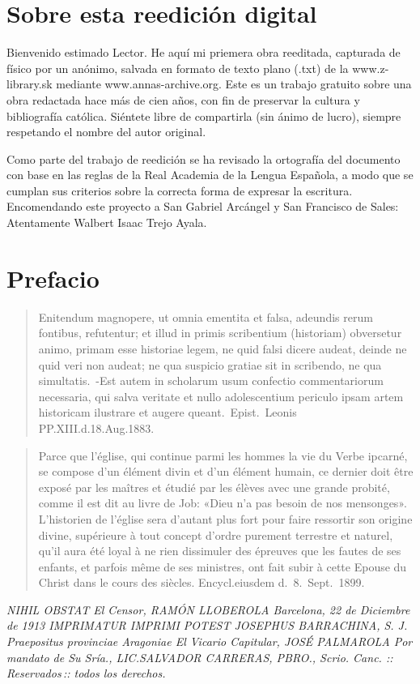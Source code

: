 \raggedbottom{} \documentclass[12pt, a4paper]{book}
\begin{document}
\section{Sobre esta reedición digital} %
Bienvenido estimado Lector. He aquí mi priemera obra reeditada, capturada de físico por un anónimo, salvada en formato de texto plano (.txt) de la www.z-library.sk mediante www.annas-archive.org\@. Este es un trabajo gratuito sobre una obra redactada hace más de cien años, con fin de preservar la cultura y bibliografía católica. Siéntete libre de compartirla (sin ánimo de lucro), siempre respetando el nombre del autor original.

Como parte del trabajo de reedición se ha revisado la ortografía del documento con base en las reglas de la Real Academia de la Lengua Española, a modo que se cumplan sus criterios sobre la correcta forma de expresar la escritura.
Encomendando este proyecto a San Gabriel Arcángel y San Francisco de Sales: Atentamente Walbert Isaac Trejo Ayala.
\section{Prefacio}
\begin{quotation}
  Enitendum magnopere, ut omnia ementita et falsa, adeundis rerum fontibus, refutentur; et illud in primis scribentium (historiam) obversetur animo, primam esse historiae legem, ne quid falsi dicere audeat, deinde ne quid veri non audeat; ne qua suspicio gratiae sit in scribendo, ne qua simultatis.\ -Est autem in scholarum usum confectio commentariorum necessaria, qui salva veritate et nullo adolescentium periculo ipsam artem historicam ilustrare et augere queant.\ Epist.\ Leonis PP.\@ XIII.\@ d.\@ 18.\@ Aug.\@ 1883.
\end{quotation}

\begin{quotation}
  Parce que l'église, qui continue parmi les hommes la vie du Verbe ipcarné, se compose d'un élément divin et d'un élément humain, ce dernier doit être exposé par les maîtres et étudié par les élèves avec une grande probité, comme il est dit au livre de Job: «Dieu n'a pas besoin de nos mensonges». L'historien de l'église sera d'autant plus fort pour faire ressortir son origine divine, supérieure à tout concept d'ordre purement terrestre et naturel, qu'il aura été loyal à ne rien dissimuler des épreuves que les fautes de ses enfants, et parfois même de ses ministres, ont fait subir à cette Epouse du Christ dans le cours des siècles.
  Encycl.\@ eiusdem d.\ 8.\ Sept.\ 1899.
\end{quotation}
\textit{
  \noindent NIHIL OBSTAT
  El Censor,
  RAMÓN LLOBEROLA
  Barcelona, 22 de Diciembre de 1913
  IMPRIMATUR
  IMPRIMI POTEST
  JOSEPHUS BARRACHINA, S. J.
  Praepositus provinciae Aragoniae
  El Vicario Capitular,
  JOSÉ PALMAROLA
  Por mandato de Su Sría.,
  LIC.\@ SALVADOR CARRERAS, PBRO.,
  Scrio. Canc.
  \quad::\, Reservados\,:: \quad
  todos los derechos.}
\newpage
\end{document}

